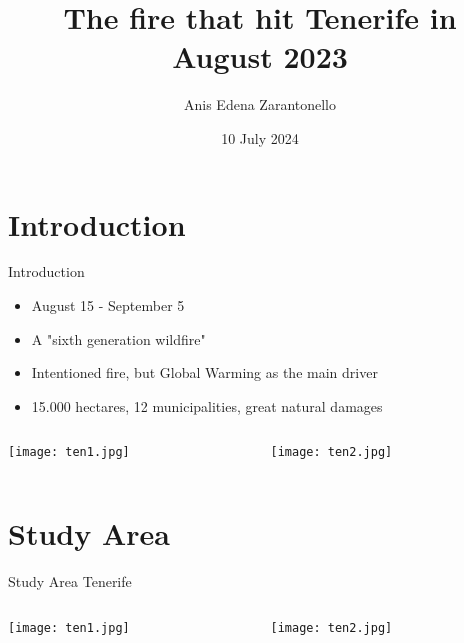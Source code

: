\documentclass{beamer}
\title{The fire that hit Tenerife in August 2023}
\author{Anis Edena Zarantonello}
\date{10 July 2024}
\begin{document}
\maketitle %



\section{Introduction} %
\begin{frame}{Introduction} %
\begin{itemize} %
    \item August 15 - September 5
    \item A "sixth generation wildfire"
    \item Intentioned fire, but Global Warming as the main driver
    \item 15.000 hectares, 12 municipalities, great natural damages
\end{itemize}
\begin{columns}
\begin{column}{0.5\textwidth}
\begin{center}
    \texttt{[image: ten1.jpg]}
\end{center}
\end{column}
\begin{column}{0.5\textwidth}  
    \begin{center}
     \texttt{[image: ten2.jpg]}
     \end{center}
\end{column}
\end{columns}
\end{frame} 

\section{Study Area} 
\begin{frame}{Study Area}
Tenerife \begin{columns}
\begin{column}{0.5\textwidth}
\begin{center}
    \texttt{[image: ten1.jpg]}
\end{center}
\end{column}
\begin{column}{0.5\textwidth}  
    \begin{center}
     \texttt{[image: ten2.jpg]}
     \end{center}
\end{column}
\end{columns}
\end{frame} 
\end{document}
